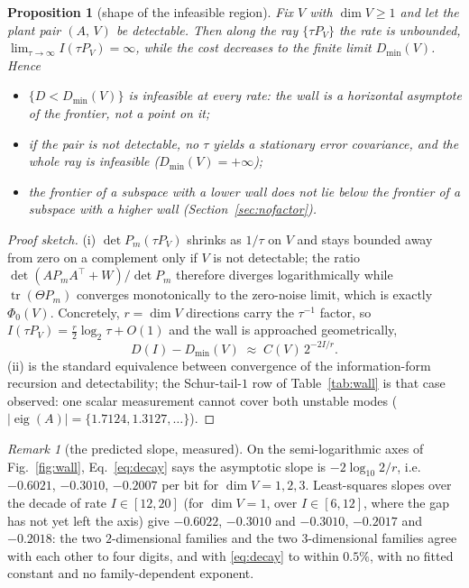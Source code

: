 \documentclass[journal]{IEEEtran}
\newtheorem{proposition}{Proposition}
\theoremstyle{remark}
\newtheorem{remark}{Remark}
\begin{document}
\begin{proposition}[shape of the infeasible region]
\label{pr:region}
Fix $V$ with $\dim V\ge1$ and let the plant pair $(A,\,V)$ be detectable. Then
along the ray $\{\tau P_V\}$ the rate is unbounded,
$\lim_{\tau\to\infty} I(\tau P_V)=\infty$, while the cost decreases to the
finite limit $D_{\min}(V)$. Hence
\begin{itemize}
 \item[(i)] $\{D<D_{\min}(V)\}$ is infeasible at \emph{every} rate: the wall is
 a horizontal asymptote of the frontier, not a point on it;
 \item[(ii)] if the pair is not detectable, no $\tau$ yields a stationary
 error covariance, and the whole ray is infeasible
 ($D_{\min}(V)=+\infty$);
 \item[(iii)] the frontier of a subspace with a lower wall does not lie below
 the frontier of a subspace with a higher wall (Section~\ref{sec:nofactor}).
\end{itemize}
\end{proposition}

\begin{proof}[Proof sketch]
(i) $\det P_m(\tau P_V)$ shrinks as $1/\tau$ on $V$ and stays bounded away from
zero on a complement only if $V$ is not detectable; the ratio
$\det(A P_m A^{\top}+W)/\det P_m$ therefore diverges logarithmically while
$\operatorname{tr}(\Theta P_m)$ converges monotonically to the zero-noise limit,
which is exactly $\Phi_0(V)$. Concretely, $r=\dim V$ directions carry the
$\tau^{-1}$ factor, so $I(\tau P_V)=\tfrac r2\log_2\tau+O(1)$ and the wall is
approached geometrically,
\begin{equation}
 D(I)-D_{\min}(V)\;\approx\;C(V)\,2^{-2I/r}.
\label{eq:decay}
\end{equation}
(ii) is the standard equivalence between convergence of the information-form
recursion and detectability; the Schur-tail-$1$ row of Table~\ref{tab:wall} is
that case observed: one scalar measurement cannot cover both unstable modes
($|\operatorname{eig}(A)|=\{1.7124,1.3127,\dots\}$).
\end{proof}

\begin{remark}[the predicted slope, measured]
\label{rmk:slope}
On the semi-logarithmic axes of Fig.~\ref{fig:wall}, Eq.~\eqref{eq:decay} says
the asymptotic slope is $-2\log_{10}2/r$, i.e.\ $-0.6021$, $-0.3010$, $-0.2007$
per bit for $\dim V=1,2,3$. Least-squares slopes over the decade of rate
$I\in[12,20]$ (for $\dim V=1$, over $I\in[6,12]$, where the gap has not yet left
the axis) give $-0.6022$, $-0.3010$ and $-0.3010$, $-0.2017$ and $-0.2018$: the
two $2$-dimensional families and the two $3$-dimensional families agree with
each other to four digits, and with \eqref{eq:decay} to within $0.5\%$, with no
fitted constant and no family-dependent exponent.

\end{remark}
\end{document}
